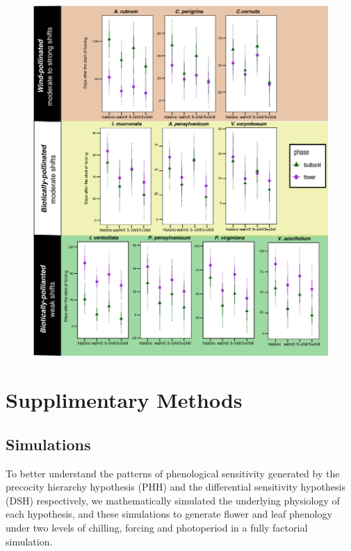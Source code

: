 \documentclass{article}\usepackage[]{graphicx}\usepackage[]{color}
\begin{document}
 \begin{figure}[!ht]
    \centering
 \includegraphics[width=\textwidth]{..//Plots/Flobuds_manuscript_figs/climpredictions.jpg}
    \caption{\textbf{}}
    \label{fig:preddy_sp}
\end{figure}

\pagebreak[4]

\section*{Supplimentary Methods}
\subsection*{Simulations}
\noident To better understand the patterns of phenological sensitivity generated by the precocity hierarchy hypothesis (PHH) and the differential sensitivity hypothesis (DSH) respectively, we mathematically simulated the underlying physiology of each hypothesis, and these simulations to generate flower and leaf phenology under two levels of chilling, forcing and photoperiod in a fully factorial simulation.\\
\end{document}
